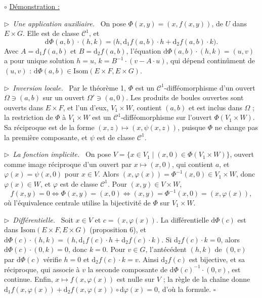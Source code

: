 \documentclass[a4paper,twoside]{report}
\newenvironment{demo}%
 {\par\needspace{4\baselineskip}\vspace{1mm}\noindent$\circ$ \underline{Démonstration :}~\setlength{\parskip}{3pt plus 1pt}}%
 {\hfill$\square$\par\vspace{2mm}}
\newcommand{\etape}[1]{\par\smallskip\noindent$\triangleright$~\textit{#1}~}
\newcommand{\dd}{\mathrm{d}}                      %
\newcommand{\Cc}{\mathcal{C}}                     %
\newcommand{\Isom}{\mathrm{Isom}}                 %
\begin{document}
\begin{demo}
\etape{Une application auxiliaire.} On pose $\Phi(x, y) = (x, f(x, y))$, de $U$ dans $E \times G$. Elle est de classe $\Cc^{1}$, et
\[ \dd\Phi(a, b)\cdot(h, k) = \big(h, \dd_{1} f(a, b)\cdot h + \dd_{2} f(a, b)\cdot k\big). \]
Avec $A = \dd_{1} f(a, b)$ et $B = \dd_{2} f(a, b)$, l'équation $\dd\Phi(a, b)\cdot(h, k) = (u, v)$ a pour unique solution $h = u$, $k = B^{-1}\cdot(v - A\cdot u)$, qui dépend continûment de $(u, v)$ : $\dd\Phi(a, b) \in \Isom(E \times F, E \times G)$.

\etape{Inversion locale.} Par le théorème 1, $\Phi$ est un $\Cc^{1}$-difféomorphisme d'un ouvert $\Omega \ni (a, b)$ sur un ouvert $\Omega' \ni (a, 0)$. Les produits de boules ouvertes sont ouverts dans $E \times F$, et l'un d'eux, $V_{1} \times W$, contient $(a, b)$ et est inclus dans $\Omega$ ; la restriction de $\Phi$ à $V_{1} \times W$ est un $\Cc^{1}$-difféomorphisme sur l'ouvert $\Phi(V_{1} \times W)$. Sa réciproque est de la forme $(x, z) \mapsto (x, \psi(x, z))$, puisque $\Phi$ ne change pas la première composante, et $\psi$ est de classe $\Cc^{1}$.

\etape{La fonction implicite.} On pose $V = \{x \in V_{1} \mid (x, 0) \in \Phi(V_{1} \times W)\}$, ouvert comme image réciproque d'un ouvert par $x \mapsto (x, 0)$, qui contient $a$, et $\varphi(x) = \psi(x, 0)$ pour $x \in V$. Alors $(x, \varphi(x)) = \Phi^{-1}(x, 0) \in V_{1} \times W$, donc $\varphi(x) \in W$, et $\varphi$ est de classe $\Cc^{1}$. Pour $(x, y) \in V \times W$,
\[ f(x, y) = 0 \iff \Phi(x, y) = (x, 0) \iff (x, y) = \Phi^{-1}(x, 0) = (x, \varphi(x)), \]
où l'équivalence centrale utilise la bijectivité de $\Phi$ sur $V_{1} \times W$.

\etape{Différentielle.} Soit $x \in V$ et $c = (x, \varphi(x))$. La différentielle $\dd\Phi(c)$ est dans $\Isom(E \times F, E \times G)$ (proposition 6), et $\dd\Phi(c)\cdot(h, k) = (h, \dd_{1} f(c)\cdot h + \dd_{2} f(c)\cdot k)$. Si $\dd_{2} f(c)\cdot k = 0$, alors $\dd\Phi(c)\cdot(0, k) = 0$, donc $k = 0$. Pour $v \in G$, l'antécédent $(h, k)$ de $(0, v)$ par $\dd\Phi(c)$ vérifie $h = 0$ et $\dd_{2} f(c)\cdot k = v$. Ainsi $\dd_{2} f(c)$ est bijective, et sa réciproque, qui associe à $v$ la seconde composante de $\dd\Phi(c)^{-1}\cdot(0, v)$, est continue. Enfin, $x \mapsto f(x, \varphi(x))$ est nulle sur $V$ ; la règle de la chaîne donne $\dd_{1} f(x, \varphi(x)) + \dd_{2} f(x, \varphi(x)) \circ \dd\varphi(x) = 0$, d'où la formule.
\end{demo}
\end{document}
